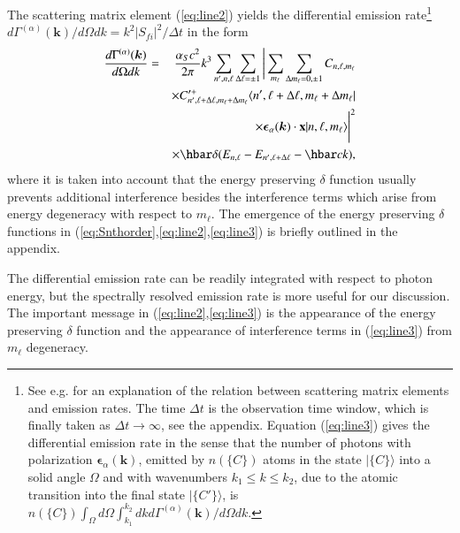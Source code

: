 \documentclass[final,3p,12pt]{elsarticle3}
\begin{document}
The scattering matrix element (\ref{eq:line2}) yields the differential 
emission rate\footnote{See e.g. \cite{heitler,rdqm} for an explanation of the
relation between scattering matrix elements and emission rates.
The time $\Delta t$ is the observation time window, which is finally taken
as $\Delta t\to\infty$, see the appendix.
Equation (\ref{eq:line3}) gives the differential emission rate in the sense
that the number of photons with polarization $\bm{\epsilon}_\alpha(\bm{k})$,
emitted by $n(\{C\})$ atoms in the 
state $\bm{|}\{C\}\bm{\rangle}$ into a solid angle $\Omega$ and with wavenumbers
$k_1\le k\le k_2$, due to the atomic
transition into the final state $\bm{|}\{C'\}\bm{\rangle}$,
is $n(\{C\})\int_{\Omega}d\Omega\int_{k_1}^{k_2}dk d\Gamma^{(\alpha)}(\bm{k})/d\Omega dk$.
}
$d\Gamma^{(\alpha)}(\bm{k})/d\Omega dk=k^2|S_{\!fi}|^2/\Delta t$ 
in the form
\begin{eqnarray}\nonumber
\frac{d\Gamma^{(\alpha)}(\bm{k})}{d\Omega dk}
&=&\frac{\alpha_S c^2}{2\pi}k^3\sum_{n',n,\ell}\sum_{\Delta\ell=\pm 1}
\Bigg|
\sum_{m_\ell}\sum_{\Delta m_\ell=0,\pm 1}
C_{n,\ell,m_\ell}
\\ \nonumber
&&\times 
C'^+_{n',\ell+\Delta\ell,m_\ell+\Delta m_\ell}
\langle n',\ell+\Delta\ell,m_\ell+\Delta m_\ell|
\\ \nonumber
&&\times 
\bm{\epsilon}_\alpha(\bm{k})\cdot\mathrm{\bf x}|n,\ell,m_\ell\rangle\Bigg|^2
\\ \label{eq:line3}
&&\times
\hbar\delta(E_{n,\ell}-E_{n',\ell+\Delta\ell}-\hbar ck),
\end{eqnarray}
where it is taken into account that the energy preserving $\delta$ function 
usually prevents additional interference besides the interference terms
which arise from energy degeneracy with respect to $m_\ell$. The emergence
of the energy preserving $\delta$ functions 
in (\ref{eq:Snthorder},\ref{eq:line2},\ref{eq:line3}) 
is briefly outlined in the appendix.

The differential emission rate can be readily integrated with respect to 
photon energy, but the spectrally resolved emission rate is more useful for 
our discussion. The important message in (\ref{eq:line2},\ref{eq:line3}) is 
the appearance of the energy preserving $\delta$ function and the appearance 
of interference terms in (\ref{eq:line3}) from $m_\ell$ degeneracy.
\end{document}
